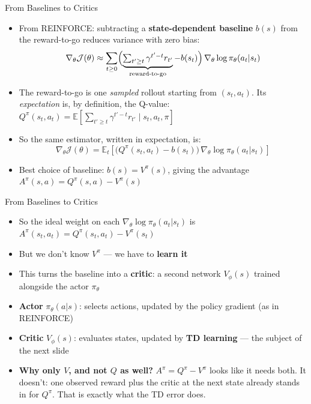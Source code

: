 \begin{frame}{From Baselines to Critics}
\begin{itemize}
    \item From REINFORCE: subtracting a \textbf{state-dependent baseline} $b(s)$ from the reward-to-go reduces variance with zero bias:
    $$\nabla_\theta \mathcal{J}(\theta) \approx \sum_{t \geq 0} \Bigl( \underbrace{\textstyle\sum_{t' \geq t} \gamma^{t'-t} r_{t'}}_{\text{reward-to-go}} - b(s_t) \Bigr)\, \nabla_\theta \log \pi_\theta(a_t|s_t)$$
    \pause
    \item The reward-to-go is one \emph{sampled} rollout starting from $(s_t, a_t)$. Its \emph{expectation} is, by definition, the Q-value: $Q^{\pi}(s_t,a_t) = \mathbb{E}\!\left[\sum_{t' \geq t} \gamma^{t'-t} r_{t'} \mid s_t, a_t, \pi\right]$
    \item So the same estimator, written in expectation, is:
    $$\nabla_\theta \mathcal{J}(\theta) = \mathbb{E}_t\!\left[\bigl(Q^{\pi}(s_t,a_t) - b(s_t)\bigr)\, \nabla_\theta \log \pi_\theta(a_t|s_t)\right]$$
    \item Best choice of baseline: $b(s) = V^{\pi}(s)$, giving the advantage $A^{\pi}(s,a) = Q^{\pi}(s,a) - V^{\pi}(s)$
\end{itemize}
\end{frame}

\begin{frame}{From Baselines to Critics}
\begin{itemize}
    \item So the ideal weight on each $\nabla_\theta \log \pi_\theta(a_t|s_t)$ is $A^{\pi}(s_t,a_t) = Q^{\pi}(s_t,a_t) - V^{\pi}(s_t)$
    \item But we don't know $V^{\pi}$ --- we have to \textbf{learn it}
    \item This turns the baseline into a \textbf{critic}: a second network $V_\phi(s)$ trained alongside the actor $\pi_\theta$
    \vspace{0.5em}
    \item \textbf{Actor} $\pi_\theta(a|s)$: selects actions, updated by the policy gradient (as in REINFORCE)
    \item \textbf{Critic} $V_\phi(s)$: evaluates states, updated by \textbf{TD learning} --- the subject of the next slide
    \pause
    \vspace{0.5em}
    \item \textbf{Why only $V$, and not $Q$ as well?} $A^{\pi} = Q^{\pi} - V^{\pi}$ looks like it needs both. It doesn't: one observed reward plus the critic at the next state already stands in for $Q^{\pi}$. That is exactly what the TD error does.
\end{itemize}
\end{frame}
